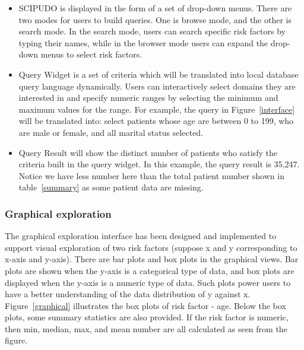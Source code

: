 \documentclass{amia}
\begin{document}
\vspace{-3mm}
\begin{itemize}
\setlength\itemsep{0em}
  \item SCIPUDO is displayed in the form of a set of drop-down menus. There are two modes for users to build queries. One is browse mode, and the other is search mode. In the search mode, users can search specific risk factors by typing their names, while in the browser mode users can expand the drop-down menus to select risk factors.
  \item Query Widget is a set of criteria which will be translated into local database query language dynamically. Users can interactively select domains they are interested in and specify numeric ranges by selecting the minimum and maximum values for the range. For example, the query in Figure~\ref{interface} will be translated into: select patients whose age are between 0 to 199, who are male or female, and all marital status selected.
  \item Query Result will show the distinct number of patients who satisfy the criteria built in the query widget. In this example, the query result is 35,247. Notice we have less number here than the total patient number shown in table~\ref{summary} as some patient data are missing.
\end{itemize}
\vspace{-3mm}

\subsubsection{Graphical exploration}
The graphical exploration interface has been designed and implemented to support visual exploration of two risk factors (suppose x and y corresponding to x-axis and y-axis). There are bar plots and box plots in the graphical views. Bar plots are shown when the y-axis is a categorical type of data, and box plots are displayed when the y-axis is a numeric type of data. Such plots power users to have a better understanding of the data distribution of y against x. Figure~\ref{graphical} illustrates the box plots of risk factor - age. Below the box plots, some summary statistics are also provided. If the risk factor is numeric, then min, median, max, and mean number are all calculated as seen from the figure.
\end{document}
